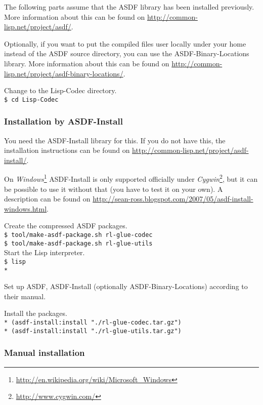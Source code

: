 \documentclass[11pt,a4paper,dvipdfm]{article}
\newcommand{\selfref}[1]{\href{#1}{#1}}
\newcommand{\footref}[2]{\textsl{#1}\footnote{\selfref{#2}}}
\newcommand{\prompttext}[1]{\texttt{#1}}
\newcommand{\shprompt}[1]{\prompttext{\$ #1}}
\newcommand{\lispprompt}[1]{\prompttext{* #1}}
\begin{document}
The following parts assume that the ASDF library has been installed
previously. More information about this can be found on
\selfref{http://common-lisp.net/project/asdf/}.

Optionally, if you want to put the compiled files user locally under your
home instead of the ASDF source directory, you can use the
ASDF-Binary-Locations library. More information about this can be found on
\selfref{http://common-lisp.net/project/asdf-binary-locations/}.

Change to the Lisp-Codec directory. \\
\shprompt{cd Lisp-Codec}

\hypertarget{asdfinst}{\subsubsection{Installation by ASDF-Install}}

You need the ASDF-Install library for this. If you do not have this, the
installation instructions can be found on
\selfref{http://common-lisp.net/project/asdf-install/}.

On \footref{Windows}{http://en.wikipedia.org/wiki/Microsoft\_Windows}
ASDF-Install is only supported officially under
\footref{Cygwin}{http://www.cygwin.com/}, but it can be possible to use it
without that (you have to test it on your own). A description can be found on
\selfref{http://sean-ross.blogspot.com/2007/05/asdf-install-windows.html}.

Create the compressed ASDF packages. \\
\shprompt{tool/make-asdf-package.sh rl-glue-codec} \\
\shprompt{tool/make-asdf-package.sh rl-glue-utils} \\

Start the Lisp interpreter. \\
\shprompt{lisp} \\
\lispprompt{}

Set up ASDF, ASDF-Install (optionally ASDF-Binary-Locations) according to
their manual.

Install the packages. \\
\lispprompt{(asdf-install:install "./rl-glue-codec.tar.gz")} \\
\lispprompt{(asdf-install:install "./rl-glue-utils.tar.gz")}

\subsubsection{Manual installation}
\end{document}
